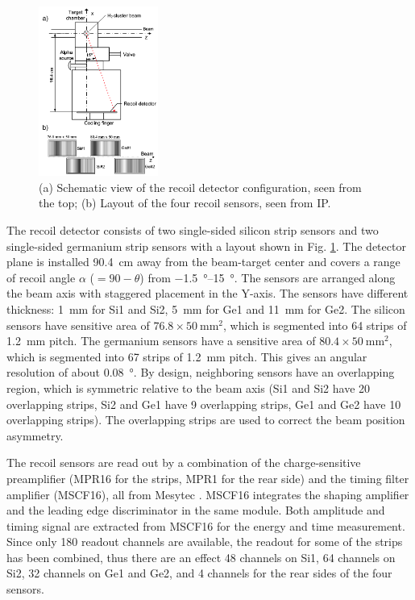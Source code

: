 \documentclass[number,5p]{elsarticle}
\begin{document}
\begin{figure}[htbp]
  \centering
  \includegraphics[width=0.35\textwidth]{./recoil_schematic.png}
  \caption{(a) Schematic view of the recoil detector configuration, seen from the
    top; (b) Layout of the four recoil sensors, seen from IP.}
  \label{fig:recoil_schematic}
\end{figure}

The recoil detector consists of two single-sided silicon strip sensors and two
single-sided germanium strip sensors with a layout shown in Fig. \ref{fig:recoil_schematic}.
The detector plane is installed \SI{90.4}{\cm} away from the beam-target center
and covers a range of recoil angle $\alpha$ ($=90-\theta$) from \SIrange[range-units=repeat]{-1.5}{15}{\degree}.
The sensors are arranged along the beam axis with staggered placement in the Y-axis.
The sensors have different thickness: \SI{1}{\mm} for Si1
and Si2, \SI{5}{\mm} for Ge1 and \SI{11}{\mm} for Ge2.
The silicon sensors have sensitive area of $76.8 \times \SI{50}{\mm\squared}$, which is
segmented into 64 strips of \SI{1.2}{\mm} pitch.
The germanium sensors have a sensitive area of \(80.4 \times \SI{50}{\mm\squared}\), which is segmented into 67 strips of \SI{1.2}{\mm} pitch.
This gives an angular resolution of about \SI{0.08}{\degree}.
By design, neighboring sensors have an overlapping region, which is symmetric
relative to the beam axis (Si1 and Si2 have 20 overlapping strips, Si2 and Ge1
have 9 overlapping strips, Ge1 and Ge2 have 10 overlapping strips).
The overlapping strips are used to correct the beam position asymmetry.

The recoil sensors are read out by a combination of the charge-sensitive preamplifier (MPR16 for the strips, MPR1 for the rear side) 
and the timing filter amplifier (MSCF16), all from Mesytec \cite{mesytec}. 
MSCF16 integrates the shaping amplifier and the leading edge discriminator in the same module.
Both amplitude and timing signal are extracted from MSCF16 for the energy and time measurement.
Since only 180 readout channels are available, the readout for some of the
strips has been combined, thus there are an effect 48 channels on Si1, 64
channels on Si2, 32 channels on Ge1 and Ge2, and 4 channels for the rear sides
of the four sensors. 
\end{document}

